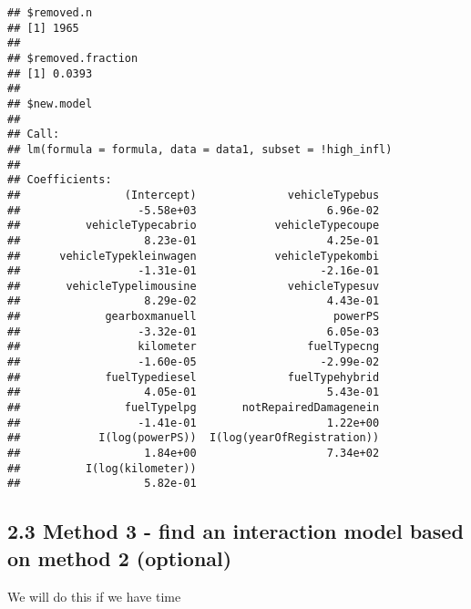 \documentclass[]{article}
\begin{document}
\begin{verbatim}
## $removed.n
## [1] 1965
## 
## $removed.fraction
## [1] 0.0393
## 
## $new.model
## 
## Call:
## lm(formula = formula, data = data1, subset = !high_infl)
## 
## Coefficients:
##                (Intercept)              vehicleTypebus  
##                  -5.58e+03                    6.96e-02  
##          vehicleTypecabrio            vehicleTypecoupe  
##                   8.23e-01                    4.25e-01  
##      vehicleTypekleinwagen            vehicleTypekombi  
##                  -1.31e-01                   -2.16e-01  
##       vehicleTypelimousine              vehicleTypesuv  
##                   8.29e-02                    4.43e-01  
##             gearboxmanuell                     powerPS  
##                  -3.32e-01                    6.05e-03  
##                  kilometer                 fuelTypecng  
##                  -1.60e-05                   -2.99e-02  
##             fuelTypediesel              fuelTypehybrid  
##                   4.05e-01                    5.43e-01  
##                fuelTypelpg       notRepairedDamagenein  
##                  -1.41e-01                    1.22e+00  
##            I(log(powerPS))  I(log(yearOfRegistration))  
##                   1.84e+00                    7.34e+02  
##          I(log(kilometer))  
##                   5.82e-01
\end{verbatim}

\hypertarget{method-3---find-an-interaction-model-based-on-method-2-optional}{%
\subsection{2.3 Method 3 - find an interaction model based on method 2
(optional)}\label{method-3---find-an-interaction-model-based-on-method-2-optional}}

We will do this if we have time
\end{document}
